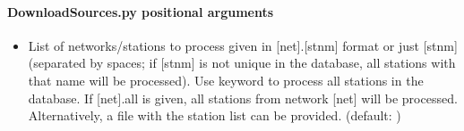 \documentclass[letterpaper,10pt,english]{sphinxmanual}
\begin{document}
\paragraph{DownloadSources.py positional arguments}
\label{\detokenize{com:DownloadSources.py-positional-arguments}}\begin{itemize}
\item {} 
\sphinxAtStartPar
{\hyperref[\detokenize{com:DownloadSources.py-all|net.stnm}]{}} \sphinxhyphen{} List of networks/stations to process given in {[}net{]}.{[}stnm{]} format or just {[}stnm{]} (separated by spaces; if {[}stnm{]} is not unique in the database, all stations with that name will be processed). Use keyword  to process all stations in the database. If {[}net{]}.all is given, all stations from network {[}net{]} will be processed. Alternatively, a file with the station list can be provided. (default: )

\end{itemize}
\end{document}
